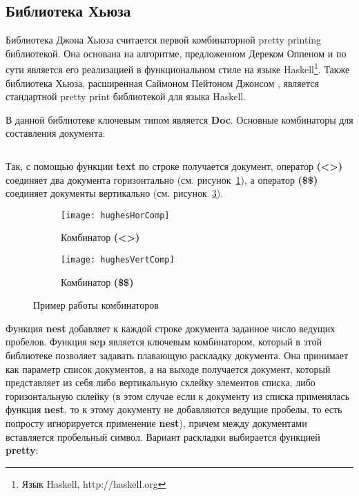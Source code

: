 \subsection{Библиотека Хьюза}

Библиотека Джона Хьюза\cite{hughes} считается первой комбинаторной pretty printing библиотекой. Она основана на алгоритме, предложенном Дереком Оппеном \cite{oppen} и по сути является его реализацией в функциональном стиле на языке Haskell\footnote{Язык Haskell, http://haskell.org}. Также библиотека Хьюза, расширенная Саймоном Пейтоном Джонсом \cite{peytonJones}, является стандартной pretty print библиотекой для языка Haskell.


В данной библиотеке ключевым типом является \textbf{Doc}. Основные комбинаторы для составления документа:
\inputminted{haskell}{codes/hughesBasicOperators.hs}

Так, с помощью функции \textbf{text} по строке получается документ, оператор \textbf{(<>)} соединяет два документа горизонтально (см. рисунок~\ref{fig:hughesHorComp}), а оператор \textbf{(\$\$)} соединяет документы вертикально (см. рисунок~\ref{fig:hughesVertComp}).

\begin{figure}[ht]
	\begin{subfigure}[b]{0.45\linewidth}
		\centering
		\texttt{[image: hughesHorComp]}
		\caption{Комбинатор \textbf{(<>)}}
		\label{fig:hughesHorComp}
	\end{subfigure}
	\hspace{0.5cm}
	\begin{subfigure}[b]{0.45\linewidth}
		\centering
		\texttt{[image: hughesVertComp]}
		\caption{Комбинатор \textbf{(\$\$)}}
		\label{fig:hughesVertComp}
	\end{subfigure}

	\caption{Пример работы комбинаторов}
\end{figure}

Функция \textbf{nest} добавляет к каждой строке документа заданное число ведущих пробелов. Функция \textbf{sep} является ключевым комбинатором, который в этой библиотеке позволяет задавать плавающую раскладку документа. Она принимает как параметр список документов, а на выходе получается документ, который представляет из себя либо вертикальную склейку элементов списка, либо горизонтальную склейку (в этом случае если к документу из списка применялась функция \textbf{nest}, то к этому документу не добавляются ведущие пробелы, то есть попросту игнорируется применение \textbf{nest}), причем между документами вставляется пробельный символ. Вариант раскладки выбирается функцией \textbf{pretty}:

